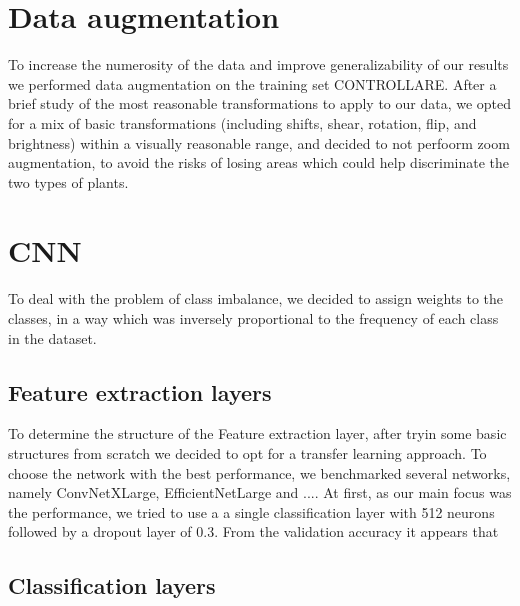 \documentclass[conference,compsoc,11pt]{IEEEtran} %
\begin{document}
\section {Data augmentation}
\vspace{-0.3cm}

To increase the numerosity of the data and improve generalizability of our results we performed data augmentation on the training set CONTROLLARE. After a brief study of the most reasonable transformations to apply to our data, we opted for a mix of basic transformations (including shifts, shear, rotation, flip, and brightness) within a visually reasonable range, and decided to not perfoorm zoom augmentation, to avoid the risks of losing areas which could help discriminate the two types of plants. 

\section{CNN}

\vspace{-0.3cm}

To deal with the problem of class imbalance, we decided to assign weights to the classes, in a way which was inversely proportional to the frequency of each class in the dataset.


\subsection{Feature extraction layers}
\vspace{-0.2cm}

To determine the structure of the Feature extraction layer, after tryin some basic structures from scratch we decided to opt for a transfer learning approach. To choose the network with the best performance, we benchmarked several networks, namely ConvNetXLarge, EfficientNetLarge and .... At first, as our main focus was the performance, we tried to use a a single classification layer with 512 neurons followed by a dropout layer of 0.3. From the validation accuracy it appears that


\subsection{Classification layers}
\vspace{-0.2cm}
\end{document}
